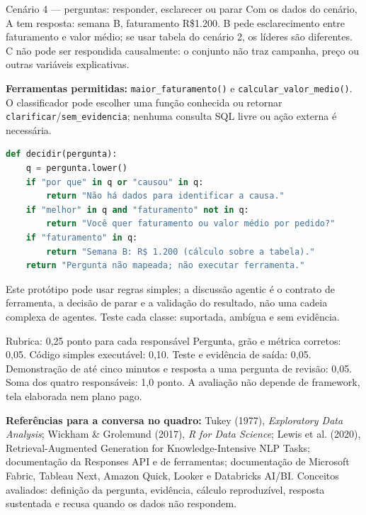 \documentclass[10pt,a4paper]{article}
\begin{document}
\begin{chave}{Cenário 4 --- perguntas: responder, esclarecer ou parar}
Com os dados do cenário, A tem resposta: semana B, faturamento R\$1.200. B pede esclarecimento entre faturamento e valor médio; se usar tabela do cenário 2, os líderes são diferentes. C não pode ser respondida causalmente: o conjunto não traz campanha, preço ou outras variáveis explicativas.

\textbf{Ferramentas permitidas:} \texttt{maior\_faturamento()} e \texttt{calcular\_valor\_medio()}. O classificador pode escolher uma função conhecida ou retornar \texttt{clarificar}/\texttt{sem\_evidencia}; nenhuma consulta SQL livre ou ação externa é necessária.

\begin{lstlisting}[language=Python]
def decidir(pergunta):
    q = pergunta.lower()
    if "por que" in q or "causou" in q:
        return "Não há dados para identificar a causa."
    if "melhor" in q and "faturamento" not in q:
        return "Você quer faturamento ou valor médio por pedido?"
    if "faturamento" in q:
        return "Semana B: R$ 1.200 (cálculo sobre a tabela)."
    return "Pergunta não mapeada; não executar ferramenta."
\end{lstlisting}
Este protótipo pode usar regras simples; a discussão agentic é o contrato de ferramenta, a decisão de parar e a validação do resultado, não uma cadeia complexa de agentes. Teste cada classe: suportada, ambígua e sem evidência.
\end{chave}

\begin{quadro}{Rubrica: 0,25 ponto para cada responsável}
Pergunta, grão e métrica corretos: 0,05. Código simples executável: 0,10. Teste e evidência de saída: 0,05. Demonstração de até cinco minutos e resposta a uma pergunta de revisão: 0,05. Soma dos quatro responsáveis: 1,0 ponto. A avaliação não depende de framework, tela elaborada nem plano pago.
\end{quadro}

\textbf{Referências para a conversa no quadro:} Tukey (1977), \emph{Exploratory Data Analysis}; Wickham \& Grolemund (2017), \emph{R for Data Science}; Lewis et al. (2020), Retrieval-Augmented Generation for Knowledge-Intensive NLP Tasks; documentação da Responses API e de ferramentas; documentação de Microsoft Fabric, Tableau Next, Amazon Quick, Looker e Databricks AI/BI. Conceitos avaliados: definição da pergunta, evidência, cálculo reproduzível, resposta sustentada e recusa quando os dados não respondem.
\end{document}
